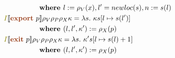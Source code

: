 \documentclass{article}
\newcommand{\sembr}[1]{[\![#1]\!]}
\newcommand{\syn}[1]{{\bf \textcolor{RawSienna}{#1}}}
\newcommand{\semcol}[1]{{\textcolor{olive}{#1}}}
\begin{document}
\begin{align*}
	  & \ \ \  \ \ \ \ \ \ \ \ \ \ \ \textbf{ where } l:=\rho_V(x),l'=newloc(s),n:=s(l)                                                                                                                                                                                                                                 \\
	  & \semcol{I}\sembr{\syn{export} \ p} \rho_V \rho_P \rho_X \kappa = \lambda s. \ \kappa s[l\mapsto s(l')]                                                                                                                                                                                                          \\
	  & \ \ \  \ \ \ \ \ \ \ \ \ \ \ \textbf{ where } (l, l', \kappa') := \rho_X(p)                                                                                                                                                                                                                                     \\
	  & \semcol{I}\sembr{\syn{exit} \ p} \rho_V \rho_P \rho_X \kappa = \lambda s. \ \kappa's[l\mapsto s(l) + 1]                                                                                                                                                                                                         \\
	  & \ \ \  \ \ \ \ \ \ \ \ \ \ \ \textbf{ where } (l, l', \kappa') := \rho_X(p)                                                                                                                                                                                                                                     \\
\end{align*}
\end{document}
